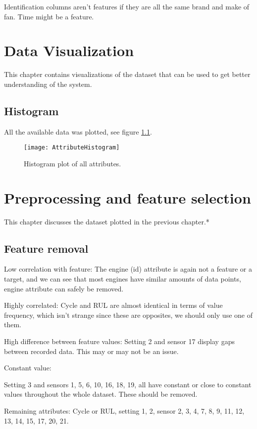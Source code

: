 \documentclass[%
oneside,    %
project,    %
nosummary   %
]{USN-MSc}
\begin{document}
Identification columns aren't features if they are all the same brand and make of fan.
Time might be a feature.

\chapter{Data Visualization}
\label{ch:visualization}
This chapter contains visualizations of the dataset that can be used to get better understanding of the system.

\section{Histogram}
\label{sec:histogram}
All the available data was plotted, see figure \ref{fig:rawHistogram}.

\begin{figure}[!ht]
  \centering
  \texttt{[image: AttributeHistogram]}
  \caption{Histogram plot of all attributes.}
  \label{fig:rawHistogram}
\end{figure}

\chapter{Preprocessing and feature selection}
\label{ch:preprocessing}
This chapter discusses the dataset plotted in the previous chapter.*

\section{Feature removal}
\label{sec:featureRemoval}

Low correlation with feature:
The engine (id) attribute is again not a feature or a target, and we can see that most engines have similar amounts of data points, engine attribute can safely be removed.

Highly correlated:
Cycle and RUL are almost identical in terms of value frequency, which isn't strange since these are opposites, we should only use one of them. 

High difference between feature values:
Setting 2 and sensor 17 display gaps between recorded data. This may or may not be an issue.

Constant value:

Setting 3 and sensors 1, 5, 6, 10, 16, 18, 19, all have constant or close to constant values throughout the whole dataset. These should be removed.

Remaining attributes:
Cycle or RUL, setting 1, 2, sensor 2, 3, 4, 7, 8, 9, 11, 12, 13, 14, 15, 17, 20, 21.
\end{document}
